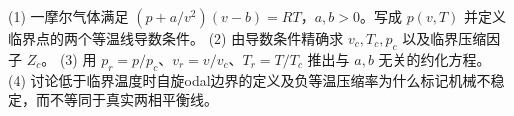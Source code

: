 (1) 一摩尔气体满足 \((p+a/v^2)(v-b)=RT\)，\(a,b>0\)。写成 \(p(v,T)\) 并定义临界点的两个等温线导数条件。
(2) 由导数条件精确求 \(v_c,T_c,p_c\) 以及临界压缩因子 \(Z_c\)。
(3) 用 \(p_r=p/p_c\)、\(v_r=v/v_c\)、\(T_r=T/T_c\) 推出与 \(a,b\) 无关的约化方程。
(4) 讨论低于临界温度时自旋odal边界的定义及负等温压缩率为什么标记机械不稳定，而不等同于真实两相平衡线。
